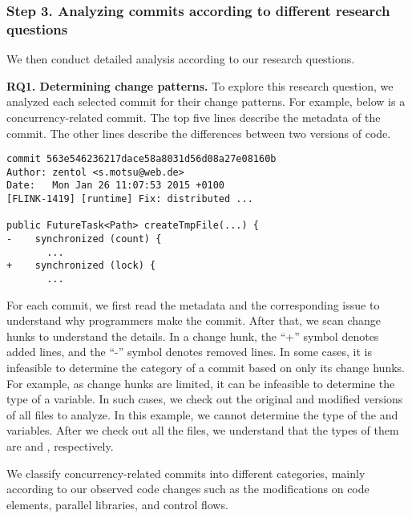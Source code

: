 \subsubsection{Step 3. Analyzing commits according to different research questions} We then conduct detailed analysis according to our research questions.


\textbf{RQ1. Determining change patterns.} To explore this research question, we analyzed each selected commit for their change patterns. For example, below is a concurrency-related commit. The top five lines describe the metadata of the commit. The other lines describe the differences between two versions of code.

\begin{lstlisting}
commit 563e546236217dace58a8031d56d08a27e08160b
Author: zentol <s.motsu@web.de>
Date:   Mon Jan 26 11:07:53 2015 +0100
[FLINK-1419] [runtime] Fix: distributed ...

public FutureTask<Path> createTmpFile(...) {
-    synchronized (count) {
       ...
+    synchronized (lock) {
       ...
\end{lstlisting}

For each commit, we first read the metadata and the corresponding issue to understand why programmers make the commit. After that, we scan change hunks to understand the details. In a change hunk, the ``+'' symbol denotes added lines, and the ``-'' symbol denotes removed lines. In some cases, it is infeasible to determine the category of a commit based on only its change hunks. For example, as change hunks are limited, it can be infeasible to determine the type of a variable. In such cases, we check out the original and modified versions of all files to analyze. In this example, we cannot determine the type of the  and  variables. After we check out all the files, we understand that the types of them are  and , respectively.

We classify concurrency-related commits into different categories, mainly according to our observed code changes such as the modifications on code elements, parallel libraries, and control flows.

